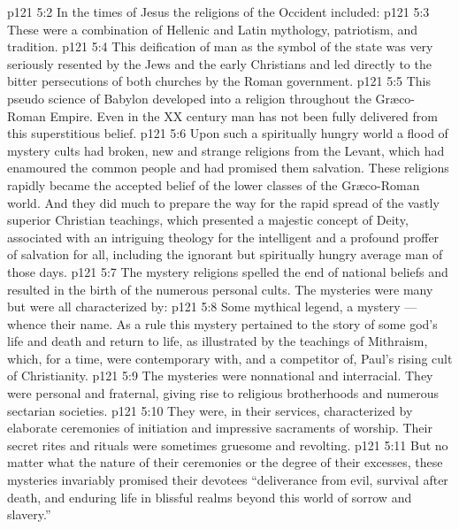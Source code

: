 \vs p121 5:2 In the times of Jesus the religions of the Occident included:
\vs p121 5:3 \bibnobreakspace {} These were a combination of Hellenic and Latin mythology, patriotism, and tradition.
\vs p121 5:4 \bibnobreakspace {} This deification of man as the symbol of the state was very seriously resented by the Jews and the early Christians and led directly to the bitter persecutions of both churches by the Roman government.
\vs p121 5:5 \bibnobreakspace {} This pseudo science of Babylon developed into a religion throughout the Gr\ae co\hyp{}Roman Empire. Even in the XX century man has not been fully delivered from this superstitious belief.
\vs p121 5:6 \bibnobreakspace {} Upon such a spiritually hungry world a flood of mystery cults had broken, new and strange religions from the Levant, which had enamoured the common people and had promised them  salvation. These religions rapidly became the accepted belief of the lower classes of the Gr\ae co\hyp{}Roman world. And they did much to prepare the way for the rapid spread of the vastly superior Christian teachings, which presented a majestic concept of Deity, associated with an intriguing theology for the intelligent and a profound proffer of salvation for all, including the ignorant but spiritually hungry average man of those days.
\vs p121 5:7 \pc The mystery religions spelled the end of national beliefs and resulted in the birth of the numerous personal cults. The mysteries were many but were all characterized by:
\vs p121 5:8 \bibnobreakspace Some mythical legend, a mystery --- whence their name. As a rule this mystery pertained to the story of some god’s life and death and return to life, as illustrated by the teachings of Mithraism, which, for a time, were contemporary with, and a competitor of, Paul’s rising cult of Christianity.
\vs p121 5:9 \bibnobreakspace The mysteries were nonnational and interracial. They were personal and fraternal, giving rise to religious brotherhoods and numerous sectarian societies.
\vs p121 5:10 \bibnobreakspace They were, in their services, characterized by elaborate ceremonies of initiation and impressive sacraments of worship. Their secret rites and rituals were sometimes gruesome and revolting.
\vs p121 5:11 \bibnobreakspace But no matter what the nature of their ceremonies or the degree of their excesses, these mysteries invariably promised their devotees  “deliverance from evil, survival after death, and enduring life in blissful realms beyond this world of sorrow and slavery.”
